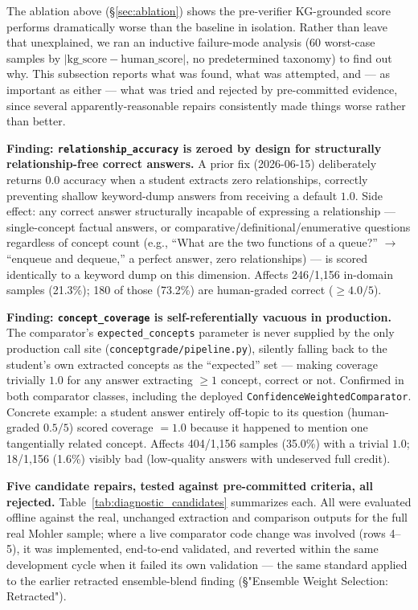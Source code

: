 \documentclass[conference]{IEEEtran}
\begin{document}
The ablation above (\S\ref{sec:ablation}) shows the pre-verifier
KG-grounded score performs dramatically worse than the baseline in
isolation. Rather than leave that unexplained, we ran an inductive
failure-mode analysis (60 worst-case samples by
$|\text{kg\_score}-\text{human\_score}|$, no predetermined taxonomy) to
find out why. This subsection reports what was found, what was
attempted, and — as important as either — what was tried and rejected by
pre-committed evidence, since several apparently-reasonable repairs
consistently made things worse rather than better.

\textbf{Finding: \texttt{relationship\_accuracy} is zeroed by design for
structurally relationship-free correct answers.} A prior fix (2026-06-15)
deliberately returns $0.0$ accuracy when a student extracts zero
relationships, correctly preventing shallow keyword-dump answers from
receiving a default $1.0$. Side effect: any correct answer structurally
incapable of expressing a relationship — single-concept factual answers,
or comparative/definitional/enumerative questions regardless of concept
count (e.g., ``What are the two functions of a queue?'' $\to$ ``enqueue
and dequeue,'' a perfect answer, zero relationships) — is scored
identically to a keyword dump on this dimension. Affects 246/1{,}156
in-domain samples (21.3\%); 180 of those (73.2\%) are human-graded
correct ($\geq 4.0/5$).

\textbf{Finding: \texttt{concept\_coverage} is self-referentially
vacuous in production.} The comparator's \texttt{expected\_concepts}
parameter is never supplied by the only production call site
(\texttt{conceptgrade/pipeline.py}), silently falling back to the
student's own extracted concepts as the ``expected'' set — making
coverage trivially $1.0$ for any answer extracting $\geq 1$ concept,
correct or not. Confirmed in both comparator classes, including the
deployed \texttt{ConfidenceWeightedComparator}. Concrete example: a
student answer entirely off-topic to its question (human-graded $0.5/5$)
scored coverage $=1.0$ because it happened to mention one tangentially
related concept. Affects 404/1{,}156 samples (35.0\%) with a trivial
$1.0$; 18/1{,}156 (1.6\%) visibly bad (low-quality answers with undeserved
full credit).

\textbf{Five candidate repairs, tested against pre-committed criteria,
all rejected.} Table~\ref{tab:diagnostic_candidates} summarizes each. All
were evaluated offline against the real, unchanged extraction and
comparison outputs for the full real Mohler sample; where a live
comparator code change was involved (rows 4--5), it was implemented,
end-to-end validated, and reverted within the same development cycle when
it failed its own validation — the same standard applied to the earlier
retracted ensemble-blend finding (\S"Ensemble Weight Selection:
Retracted").
\end{document}
